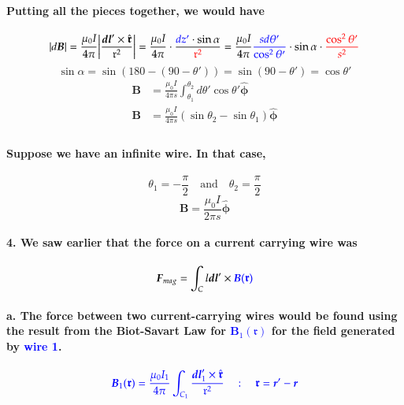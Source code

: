 \documentclass{article}
\begin{document}
\paragraph{Putting all the pieces together, we would have}
\begin{equation*}
    |d\boldsymbol{B}|=\frac{\mu_0I}{4\pi}\bigg|\frac{\boldsymbol{dl}'\times\hat{\boldsymbol{\mathfrak{r}}}}{\mathfrak{r}^2}\bigg|=\frac{\mu_0I}{4\pi}\cdot\frac{\textcolor{blue}{dz'}\cdot\sin\alpha}{\textcolor{red}{\mathfrak{r}^2}}=\frac{\mu_0I}{4\pi}\textcolor{blue}{\frac{sd\theta'}{\cos^2\theta'}}\cdot\sin\alpha\cdot\textcolor{red}{\frac{\cos^2\theta'}{s^2}}
\end{equation*}
\begin{equation*}
    \sin\alpha=\sin(180-(90-\theta'))=\sin(90-\theta')=\cos\theta'
\end{equation*}
\begin{align*}
    \boldsymbol{B}&=\frac{\mu_0I}{4\pi s}\int_{\theta_1}^{\theta_2}d\theta'\cos\theta'\hat{\boldsymbol{\phi}}\\
    \boldsymbol{B}&=\frac{\mu_0I}{4\pi s}(\sin\theta_2-\sin\theta_1)\hat{\boldsymbol{\phi}}\\
\end{align*}
\paragraph{Suppose we have an infinite wire. In that case,}
\begin{equation*}
    \theta_1=-\frac{\pi}{2}\quad\text{and}\quad\theta_2=\frac{\pi}{2}
\end{equation*}
\begin{equation*}
    \boldsymbol{B}=\frac{\mu_0I}{2\pi s}\hat{\boldsymbol{\phi}}
\end{equation*}
\paragraph{4. We saw earlier that the force on a current carrying wire was}
\begin{equation*}
    \boldsymbol{F}_{mag}=\int_C l\boldsymbol{dl}'\times \textcolor{blue}{\boldsymbol{B}(\boldsymbol{\mathfrak{r}})}
\end{equation*}
\paragraph{\indent a. The force between \textbf{two} current-carrying wires would be found using the result from the Biot-Savart Law for \textcolor{blue}{$\boldsymbol{B}_1(\boldsymbol{\mathfrak{r}})$} for the field generated by \textcolor{blue}{wire 1}.}
\begin{equation*}
    \textcolor{blue}{\boldsymbol{B}_1(\boldsymbol{\mathfrak{r}}) = \frac{\mu_0I_1}{4\pi} \int_{C_1} \frac{\boldsymbol{dl}_1'\times \hat{\boldsymbol{\mathfrak{r}}}}{\mathfrak{r}^2}\quad:\quad \boldsymbol{\mathfrak{r}}=\boldsymbol{r}'-\boldsymbol{r}}
\end{equation*}
\end{document}
